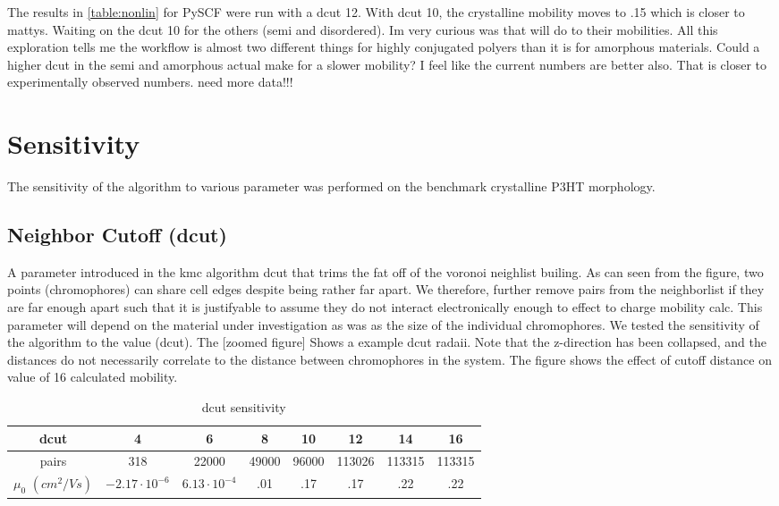 The results in \ref{table:nonlin} for PySCF were run with a dcut 12. With dcut 10, the crystalline mobility
moves to .15 which is closer to mattys. Waiting on the dcut 10 for the others (semi and disordered). Im very
curious was that will do to their mobilities. All this exploration tells me the workflow is almost two
different things for highly conjugated polyers than it is for amorphous materials. Could a higher dcut in the
semi and amorphous actual make for a slower mobility? I feel like the current numbers are better also. That is
closer to experimentally observed numbers. need more data!!!


\section{Sensitivity}

The sensitivity of the algorithm to various parameter was performed on the benchmark crystalline P3HT
morphology.

\subsection{Neighbor Cutoff (dcut)}

A parameter introduced in the kmc algorithm dcut that trims the fat off of the voronoi neighlist builing.
As can seen from the figure, two points (chromophores) can share cell edges despite being rather far apart. We
therefore, further remove pairs from the neighborlist if they are far enough apart such that it is justifyable
to assume they do not interact electronically enough to effect to charge mobility calc. This parameter will
depend on the material under investigation as was as the size of the individual chromophores. We tested the
sensitivity of the algorithm to the value (dcut). The [zoomed figure] Shows a example dcut radaii. Note that
the z-direction has been collapsed, and the distances do not necessarily correlate to the distance
between chromophores in the system. The figure shows the effect of cutoff distance on value of
16 calculated mobility.


\begin{table}[ht]
\caption{dcut sensitivity}
\centering %
\begin{tabular}{c c c c c c c c} %
\hline\hline %
dcut & 4 & 6 & 8 & 10 & 12 & 14 & 16 \\ [0.5ex] %
\hline  %
pairs & 318 & 22000 & 49000 & 96000 & 113026 & 113315 & 113315 \\ [1ex]%
$\mu_{0}$ $(cm^{2}/Vs)$ & $-2.17 \cdot 10^{-6}$ & $6.13 \cdot 10^{-4}$ & .01 & .17 & .17 & .22 & .22 \\ [1ex] %
\hline %
\end{tabular}
\label{table:dcut-sense} %
\end{table}

